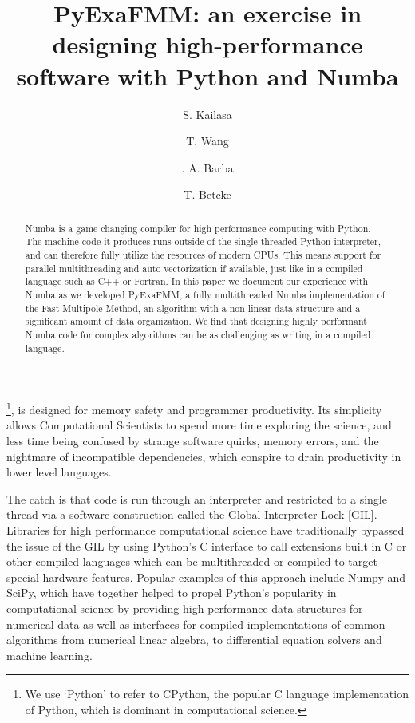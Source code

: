 \documentclass{IEEEcsmag}
\begin{document}

\title{PyExaFMM: an exercise in designing high-performance software with Python and Numba}

\author{S. Kailasa}

\author{T. Wang}

\author{. A. Barba}

\author{T. Betcke}


\begin{abstract}
    Numba is a game changing compiler for high performance computing with Python. The machine code it produces runs outside of the single-threaded Python interpreter, and can therefore fully utilize the resources of modern CPUs. This means support for parallel multithreading and auto vectorization if available, just like in a compiled language such as C++ or Fortran. In this paper we document our experience with Numba as we developed PyExaFMM, a fully multithreaded Numba implementation of the Fast Multipole Method, an algorithm with a non-linear data structure and a significant amount of data organization. We find that designing highly performant Numba code for complex algorithms can be as challenging as writing in a compiled language.
\end{abstract}

\maketitle
{}\footnote{We use `Python' to refer to CPython, the popular C language implementation of Python, which is dominant in computational science.}, is designed for memory safety and programmer productivity. Its simplicity allows Computational Scientists to spend more time exploring the science, and less time being confused by strange software quirks, memory errors, and the nightmare of incompatible dependencies, which conspire to drain productivity in lower level languages.

The catch is that code is run through an interpreter and restricted to a single thread via a software construction called the Global Interpreter Lock [GIL]. Libraries for high performance computational science have traditionally bypassed the issue of the GIL by using Python's C interface to call extensions built in C or other compiled languages which can be multithreaded or compiled to target special hardware features. Popular examples of this approach include Numpy and SciPy, which have together helped to propel Python's popularity in computational science by providing high performance data structures for numerical data as well as interfaces for compiled implementations of common algorithms from numerical linear algebra, to differential equation solvers and machine learning.
\end{document}
